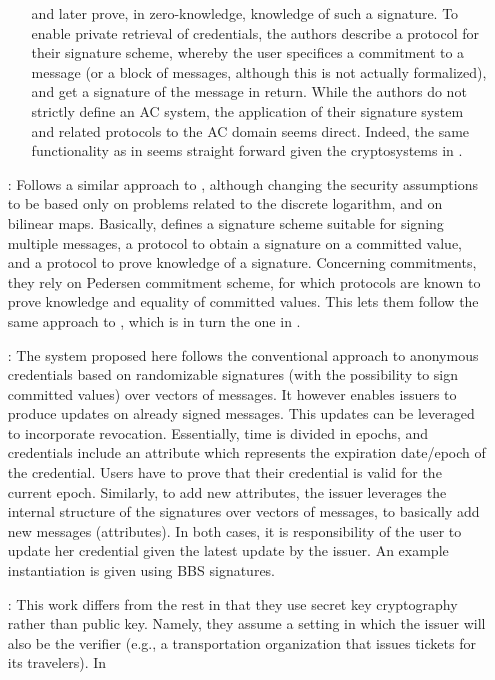 \begin{enumerate}
\begin{itemize}
    and later prove, in zero-knowledge, knowledge of such a signature. To
    enable private retrieval of credentials, the authors describe a protocol
    for their signature scheme, whereby the user specifices a commitment to
    a message (or a block of messages, although this is not actually
    formalized), and get a signature of the message in return. While the
    authors do not strictly define an AC system, the application of their
    signature system and related protocols to the AC domain seems direct.
    Indeed, the same functionality as in \cite{cl01} seems straight
    forward given the cryptosystems in \cite{cl02}.
  \end{itemize}
\item[\cite{cl04}:] Follows a similar approach to \cite{cl02}, although
  changing the security assumptions to be based only on problems related
  to the discrete logarithm, and on bilinear maps. Basically, defines a
  signature scheme suitable for signing multiple messages, a protocol to
  obtain a signature on a committed value, and a protocol to prove knowledge
  of a signature. Concerning commitments, they rely on Pedersen commitment
  scheme, for which protocols are known to prove knowledge and equality of
  committed values. This lets them follow the same approach to \cite{cl02},
  which is in turn the one in \cite{cl01}.
\item[\cite{cks10}:] The system proposed here follows the conventional
  approach to anonymous credentials based on randomizable signatures (with
  the possibility to sign committed values) over vectors of messages.
  It however enables issuers to produce updates on already signed messages.
  This updates can be leveraged to incorporate revocation. Essentially,
  time is divided in epochs, and credentials include an attribute which
  represents the expiration date/epoch of the credential. Users have to
  prove that their credential is valid for the current epoch. Similarly,
  to add new attributes, the issuer leverages the internal structure of
  the signatures over vectors of messages, to basically add new messages
  (attributes). In both cases, it is responsibility of the user to update
  her credential given the latest update by the issuer. An example
  instantiation is given using BBS signatures.
\item[\cite{cmz14}:] This work differs from the rest in that they use
  secret key cryptography rather than public key. Namely, they assume a
  setting in which the issuer will also be the verifier (e.g., a
  transportation organization that issues tickets for its travelers). In

\end{enumerate}
